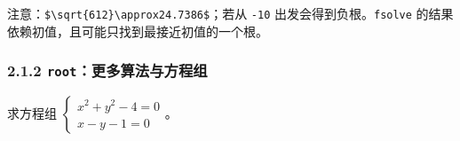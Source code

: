 \begin{Shaded}
\begin{Highlighting}[]
\OperatorTok{=}\OperatorTok{=}\NormalTok{)}

    \OperatorTok{**} \OperatorTok{{-}} 

\NormalTok{))}
\end{Highlighting}
\end{Shaded}

\begin{Shaded}
\begin{Highlighting}[]
\NormalTok{[24.7386]}
\end{Highlighting}
\end{Shaded}

注意：\texttt{\$\textbackslash{}sqrt\{612\}\textbackslash{}approx24.7386\$}；若从
\texttt{-10} 出发会得到负根。\texttt{fsolve}
的结果依赖初值，且可能只找到最接近初值的一个根。

\subsubsection{\texorpdfstring{2.1.2
\texttt{root}：更多算法与方程组}{2.1.2 root：更多算法与方程组}}\label{rootux66f4ux591aux7b97ux6cd5ux4e0eux65b9ux7a0bux7ec4}

求方程组 \(\begin{cases}x^2+y^2-4=0\\ x-y-1=0\end{cases}\)。

\begin{Shaded}
\begin{Highlighting}[]

\OperatorTok{=}
    \NormalTok{ [x}\OperatorTok{**} \OperatorTok{+}\OperatorTok{**} \OperatorTok{{-}} \OperatorTok{{-}}\OperatorTok{{-}} \NormalTok{]}

\OperatorTok{=}\NormalTok{ root(func, [}\NormalTok{, }\NormalTok{])}
\end{Highlighting}
\end{Shaded}

